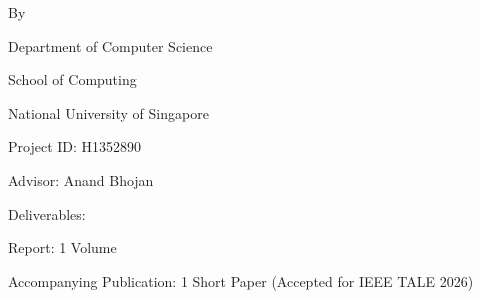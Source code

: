 \begin{titlepage}
    {\centering
    {\large \projecttype}
    \vfill
    {\LARGE\bfseries \projecttitle\par}
    \vspace{2cm}
    {\large By\par \authorname}
    \vfill
    {\normalsize Department of Computer Science\par
    School of Computing\par
    National University of Singapore\par}
    \vspace{1cm}
    {\normalsize \academicyear\par}
    }
    \vspace{1cm}
    Project ID: H1352890 \par
    Advisor: Anand Bhojan \par
    \vspace{1cm}
    Deliverables: \par
    \begin{list}{\quad}{}
        \item Report: 1 Volume
        \item Accompanying Publication: 1 Short Paper (Accepted for IEEE TALE 2026)
    \end{list}
\end{titlepage}
\restoregeometry
\pagebreak

